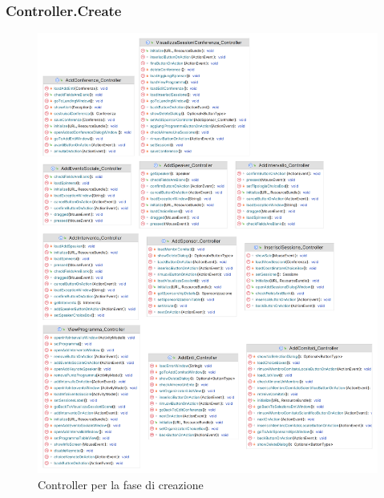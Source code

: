 \subsubsection{Controller.Create}

\begin{figure}[h!]
	\includegraphics[scale=0.17]{Immagini/Controller_Creazione.png}
	\caption{Controller per la fase di creazione}
\end{figure}
\newpage

